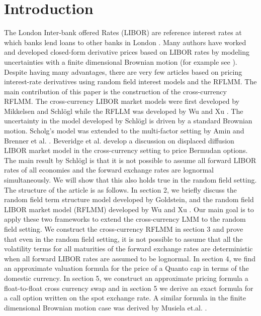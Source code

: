 \documentclass[11pt]{article}
\begin{document}
\section{Introduction}
The London Inter-bank offered Rates (LIBOR) are reference interest rates at which banks lend loans to other banks in London \cite{lixinwu2019interest}. Many authors have worked and developed closed-form derivative prices based on LIBOR rates by modeling uncertainties with a finite dimensional Brownian motion (for example see \cite{brace1997market,jamshidian1997libor,jamshidian1999libor,musiela1997continuous}). Despite having many advantages, there are very few articles based on pricing interest-rate derivatives using random field interest models and the RFLMM. The main contribution of this paper is the construction of the cross-currency RFLMM. The cross-currency LIBOR market models were first developed by Mikkelsen \cite{mikkelsen2001cross} and Schl\"ogl\cite{schlogl} while the RFLLM was developed by Wu and Xu \cite{wu}. The uncertainty in the model developed by Schl\"ogl is driven by a standard Brownian motion. Scholg's model was extended to the multi-factor setting by Amin \cite{amin2003multi} and Brenner et al. \cite{benner2009multi}. Beveridge et al.\cite{beveridge2010efficient} develop a discussion on displaced diffusion LIBOR market model in the cross-currency setting to price Bermudan options. The main result by Schl\"ogl \cite{schlogl} is that it is not possible to assume all forward LIBOR rates of all economies and the forward exchange rates are lognormal simultaneously. We will show that this also holds true in the random field setting.\\

The structure of the article is as follows. In section 2, we briefly discuss the random field term structure model developed by Goldstein\cite{goldstein2000term}, and the random field LIBOR market model (RFLMM) developed by Wu and Xu \cite{wu}. Our main goal is to apply these two frameworks to extend the cross-currency LMM \cite{schlogl} to the random field setting. We construct the cross-currency RFLMM in section 3 and prove that even in the random field setting, it is not possible to assume that all the volatility terms for all maturities of the forward exchange rates are deterministic when all forward LIBOR rates are assumed to be lognormal. In section 4, we find an approximate valuation formula for the price of a Quanto cap in terms of the domestic currency. In section 5, we construct an approximate pricing formula a float-to-float cross currency swap and in section 5 we derive an exact formula for a call option written on the spot exchange rate. A similar formula in the finite dimensional Brownian motion case was derived by Musiela et.al. \cite{musiela}.
\end{document}
